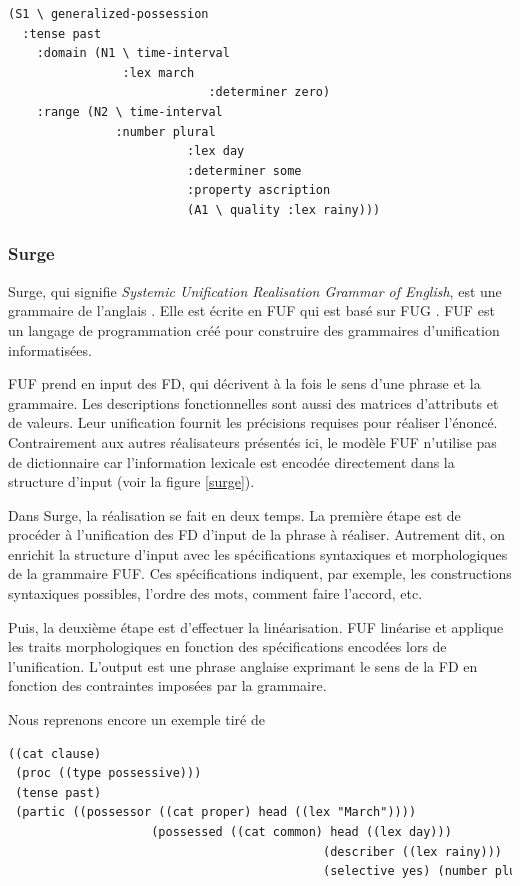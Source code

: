 \begin{lstlisting}[language=Xml, caption=SPL: input de KPML, label=kpml]
(S1 \ generalized-possession
  :tense past 
	:domain (N1 \ time-interval
	            :lex march
							:determiner zero)
	:range (N2 \ time-interval
	           :number plural
						 :lex day
						 :determiner some
						 :property ascription
						 (A1 \ quality :lex rainy)))
\end{lstlisting}

\subsubsection{Surge}
Surge, qui signifie \emph{Systemic Unification Realisation Grammar of English}, est une grammaire de l'anglais \citep{Elhadad98surge:a}. Elle est écrite en \ac{FUF} qui est basé sur \acf{FUG} \citep{KayFunctionalUnificationGrammar1984}. \ac{FUF} est un langage de programmation créé pour construire des grammaires d'unification informatisées.

\ac{FUF} prend en input des \ac{FD}, qui décrivent à la fois le sens d'une phrase et la grammaire. Les descriptions fonctionnelles sont aussi des matrices d'attributs et de valeurs. Leur unification fournit les précisions requises pour réaliser l'énoncé. Contrairement aux autres réalisateurs présentés ici, le modèle \ac{FUF} n'utilise pas de dictionnaire car l'information lexicale est encodée directement dans la structure d'input (voir la figure \ref{surge}).

Dans Surge, la réalisation se fait en deux temps. La première étape est de procéder à l'unification des \ac{FD} d'input de la phrase à réaliser. Autrement dit, on enrichit la structure d’input avec les spécifications syntaxiques et morphologiques de la grammaire \ac{FUF}. Ces spécifications indiquent, par exemple, les constructions syntaxiques possibles, l'ordre des mots, comment faire l'accord, etc.

Puis, la deuxième étape est d'effectuer la linéarisation. \ac{FUF} linéarise et applique les traits morphologiques en fonction des spécifications encodées lors de l'unification. L'output est une phrase anglaise exprimant le sens de la \ac{FD} en fonction des contraintes imposées par la grammaire.

Nous reprenons encore un exemple tiré de \cite{ReiterBuildingNaturalLanguage2000} 
\begin{lstlisting}[language=Xml, caption=FD: input de Surge, label=surge]
((cat clause)
 (proc ((type possessive)))
 (tense past)
 (partic ((possessor ((cat proper) head ((lex "March"))))
					(possessed ((cat common) head ((lex day)))
											(describer ((lex rainy)))
											(selective yes) (number plural)))))
\end{lstlisting}

